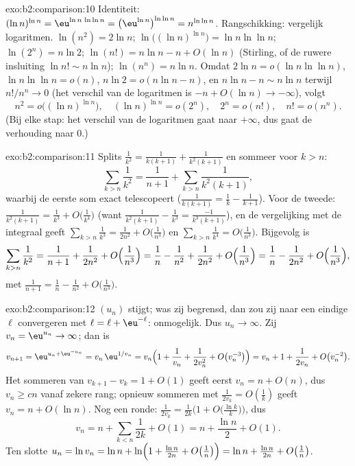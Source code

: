 \begin{solution}{exo:b2:comparison:10}
Identiteit: $(\ln n)^{\ln n} = \eu^{\ln n\,\ln\ln n} =
\bigl(\eu^{\ln n}\bigr)^{\ln\ln n} = n^{\ln\ln n}$. Rangschikking:
vergelijk logaritmen. $\ln(n^2) = 2\ln n$; $\ln\bigl((\ln
n)^{\ln n}\bigr) = \ln n\ln\ln n$; $\ln(2^n) = n\ln2$; $\ln(n!) =
n\ln n - n + O(\ln n)$ (Stirling, of de ruwere insluiting $\ln n!
\sim n\ln n$); $\ln(n^n) = n\ln n$. Omdat $2\ln n = o(\ln n\ln\ln
n)$, $\ln n\ln\ln n = o(n)$, $n\ln 2 = o(n\ln n - n)$, en $n \ln n
- n \sim n\ln n$ terwijl $n! / n^n \to 0$ (het verschil van de
logaritmen is $-n + O(\ln n) \to -\infty$), volgt
\[
n^2 = o\bigl((\ln n)^{\ln n}\bigr),\quad
(\ln n)^{\ln n} = o(2^n),\quad
2^n = o(n!),\quad
n! = o(n^n).
\]
(Bij elke stap: het verschil van de logaritmen gaat naar
$+\infty$, dus gaat de verhouding naar $0$.)
\end{solution}

\begin{solution}{exo:b2:comparison:11}
Splits $\frac1{k^2} = \frac1{k(k+1)} + \frac1{k^2(k+1)}$ en sommeer
voor $k > n$:
\[
\sum_{k>n}\frac1{k^2} = \frac1{n+1} +
\sum_{k>n}\frac{1}{k^2(k+1)} ,
\]
waarbij de eerste som exact telescopeert ($\frac1{k(k+1)} = \frac1k
- \frac1{k+1}$). Voor de tweede: $\frac{1}{k^2(k+1)} = \frac1{k^3}
+ O\bigl(\frac1{k^4}\bigr)$ (want $\frac{1}{k^2(k+1)} -
\frac1{k^3} = \frac{-1}{k^3(k+1)}$), en de vergelijking met de
integraal geeft $\sum_{k>n}\frac1{k^3} = \frac1{2n^2} +
O\bigl(\frac1{n^3}\bigr)$ en $\sum_{k>n}\frac1{k^4} =
O\bigl(\frac1{n^3}\bigr)$. Bijgevolg is
\[
\sum_{k>n}\frac1{k^2}
= \frac1{n+1} + \frac{1}{2n^2} + O\Bigl(\frac1{n^3}\Bigr)
= \frac1n - \frac1{n^2} + \frac{1}{2n^2} +
O\Bigl(\frac1{n^3}\Bigr)
= \frac1n - \frac{1}{2n^2} + O\Bigl(\frac1{n^3}\Bigr),
\]
met $\frac1{n+1} = \frac1n - \frac1{n^2} +
O\bigl(\frac1{n^3}\bigr)$.
\end{solution}

\begin{solution}{exo:b2:comparison:12}
$(u_n)$ stijgt; was zij begrensd, dan zou zij naar een eindige
$\ell$ convergeren met $\ell = \ell + \eu^{-\ell}$: onmogelijk. Dus
$u_n \to \infty$. Zij $v_n = \eu^{u_n} \to \infty$; dan is
\[
v_{n+1} = \eu^{u_n + \eu^{-u_n}} = v_n\,\eu^{1/v_n}
= v_n\Bigl(1 + \frac1{v_n} + \frac1{2v_n^2} +
O\bigl(v_n^{-3}\bigr)\Bigr)
= v_n + 1 + \frac{1}{2v_n} + O\bigl(v_n^{-2}\bigr).
\]
Het sommeren van $v_{k+1} - v_k = 1 + O(1)$ geeft eerst $v_n = n +
O(n)$, dus $v_n \geq cn$ vanaf zekere rang; opnieuw sommeren met
$\frac1{2v_k} = O(\frac1k)$ geeft $v_n = n + O(\ln n)$. Nog een
ronde: $\frac{1}{2v_k} = \frac{1}{2k}\bigl(1 +
O\bigl(\tfrac{\ln k}k\bigr)\bigr)$, dus
\[
v_n = n + \sum_{k<n}\frac1{2k} + O(1) = n + \frac{\ln n}2 +
O(1).
\]
Ten slotte $u_n = \ln v_n = \ln n + \ln\Bigl(1 + \frac{\ln n}{2n} +
O\bigl(\tfrac1n\bigr)\Bigr) = \ln n + \frac{\ln n}{2n} +
O\bigl(\tfrac1n\bigr)$.
\end{solution}

